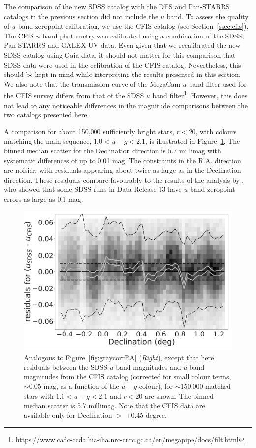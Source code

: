 \documentclass[fleqn,usenatbib]{mnras}
\begin{document}
The comparison of the new SDSS catalog with the DES and Pan-STARRS catalogs in the previous
section did not include the $u$ band. To assess the quality of $u$ band zeropoint calibration, 
we use the CFIS catalog (see Section~\ref{ssec:cfis}). The CFIS $u$ band photometry was 
calibrated using a combination of the SDSS, Pan-STARRS and GALEX UV data. Even given that
we recalibrated the new SDSS catalog using Gaia data, it should not matter for this comparison that SDSS data were used in the calibration of the CFIS catalog. Nevertheless, this should be kept in mind while interpreting the results presented in this section.  We also note that the transmission curve of the MegaCam $u$ band filter used for the CFIS survey differs from that of the SDSS $u$ band filter\footnote{https://www.cadc-ccda.hia-iha.nrc-cnrc.gc.ca/en/megapipe/docs/filt.html}. However, this does not lead to any noticeable differences in the magnitude comparisons between the two catalogs presented here. 

A comparison for about 150,000 sufficiently bright stars, $r<20$, with colours matching the main sequence, $1.0 <u-g < 2.1$,  is illustrated in Figure~\ref{fig:CFIS}. The binned median scatter for the Declination direction is 
5.7 millimag with systematic differences of up to 0.01 mag. The constraints in the R.A. direction 
are noisier, with residuals appearing about twice as large as in the Declination direction. 
These residuals compare favourably to the results of the analysis by \cite{2017ApJ...848..128I}, 
who showed that some SDSS runs in Data Release 13 have $u$-band zeropoint errors as large
as 0.1 mag. 

 
\begin{figure}
    \centering\includegraphics[width=0.95\columnwidth]{figures/colorResidCFISug_Dec_Hess_lr.png} 
\caption{Analogous to Figure~\ref{fig:graycorrRA} ({\it Right}), except that here residuals 
between the SDSS $u$ band magnitudes and $u$ band magnitudes from the CFIS
catalog (corrected for small colour terms, $\sim0.05$ mag, as a function of the $u-g$ colour),
for $\sim$150,000 matched stars with $1.0 <u-g < 2.1$ and $r<20$ are shown. 
The binned median scatter is 5.7 millimag. Note that the CFIS data are available
only for Declination $>$ $+$0.45 degree.}
\label{fig:CFIS}
\end{figure}
\end{document}
